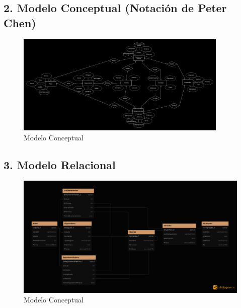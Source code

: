 \documentclass[12pt]{article}
\begin{document}
    \subsection*{2. Modelo Conceptual (Notación de Peter Chen)}
    \begin{figure}[h]
        \centering
        \includegraphics[width=0.9\textwidth]{EAuto.png}
        \caption{Modelo Conceptual}
        \label{fig:modelo-conceptual}
    \end{figure}

    \subsection*{3. Modelo Relacional}
    \begin{figure}[h]
        \centering
        \includegraphics[width=1.0\textwidth]{ERAuto.png}
        \caption{Modelo Conceptual}
        \label{fig:modelo-conceptual}
    \end{figure}
\end{document}
